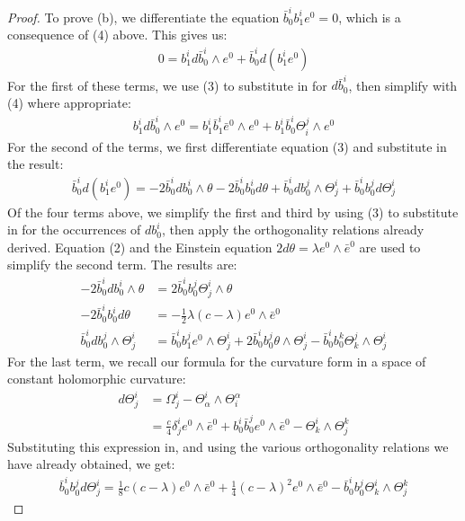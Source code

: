 \documentclass[11pt]{amsart}
\theoremstyle{definition}
\begin{document}
\begin{proof}
To prove (b), we differentiate the equation $\bar{b}^i_0 b^i_1 e^0 = 0$, which is a consequence of (4) above.  This gives us:
%
\begin{align*}
0 = b^i_1 d \bar{b}^i_0 \wedge e^0 + \bar{b}^i_0 d( b^i_1 e^0 )
\end{align*}
%
For the first of these terms, we use (3) to substitute in for $d \bar{b}^i_0$, then simplify with (4) where appropriate:
%
\begin{align*}
b^i_1 d \bar{b}^i_0 \wedge e^0 = b^i_1 \bar{b}^i_1 \bar{e}^0 \wedge e^0 + b^i_1 \bar{b}^i_0 \Theta^j_i \wedge e^0
\end{align*}
%
For the second of the terms, we first differentiate equation (3) and substitute in the result:
%
\begin{align*}
\bar{b}^i_0 d( b^i_1 e^0 ) = -2 \bar{b}^i_0 d b^i_0 \wedge \theta - 2 \bar{b}^i_0 b^i_0 d \theta + \bar{b}^i_0 d b^j_0 \wedge \Theta^i_j + \bar{b}^i_0 b^j_0 d \Theta^i_j
\end{align*}
%
Of the four terms above, we simplify the first and third by using (3) to substitute in for the occurrences of $d b^i_0$, then apply the orthogonality relations already derived. Equation (2) and the Einstein equation $2 d \theta = \lambda e^0 \wedge \bar{e}^0$ are used to simplify the second term.  The results are:
%
\begin{align*}
-2 \bar{b}^i_0 d b^i_0 \wedge \theta &= 2 \bar{b}^i_0 b^j_0 \Theta^i_j \wedge \theta \\
-2 \bar{b}^i_0 b^i_0 d \theta &= - \frac{1}{2} \lambda ( c - \lambda ) e^0 \wedge \bar{e}^0 \\
\bar{b}^i_0 d b^j_0 \wedge \Theta^i_j &= \bar{b}^i_0 b^j_1 e^0 \wedge \Theta^i_j + 2 \bar{b}^i_0 b^j_0  \theta \wedge \Theta^i_j - \bar{b}^i_0 b^k_0 \Theta^j_k \wedge \Theta^i_j
\end{align*}
%
For the last term, we recall our formula for the curvature form in a space of constant holomorphic curvature:
%
\begin{align*}
d \Theta^i_j &= \Omega^i_j - \Theta^i_{\alpha} \wedge \Theta^{\alpha}_i \\
&= \frac{c}{4} \delta^i_j e^0 \wedge \bar{e}^0 + b^i_0 \bar{b}^j_0 e^0 \wedge \bar{e}^0 - \Theta^i_k \wedge \Theta^k_j
\end{align*}
%
Substituting this expression in, and using the various orthogonality relations we have already obtained, we get:
%
\begin{align*}
\bar{b}^i_0 b^j_0 d \Theta^i_j = \frac{1}{8} c (c- \lambda) e^0 \wedge \bar{e}^0 + \frac{1}{4} (c - \lambda)^2 e^0 \wedge \bar{e}^0 - \bar{b}^i_0 b^j_0 \Theta^i_k \wedge \Theta^k_j

\end{align*}
\end{proof}
\end{document}
